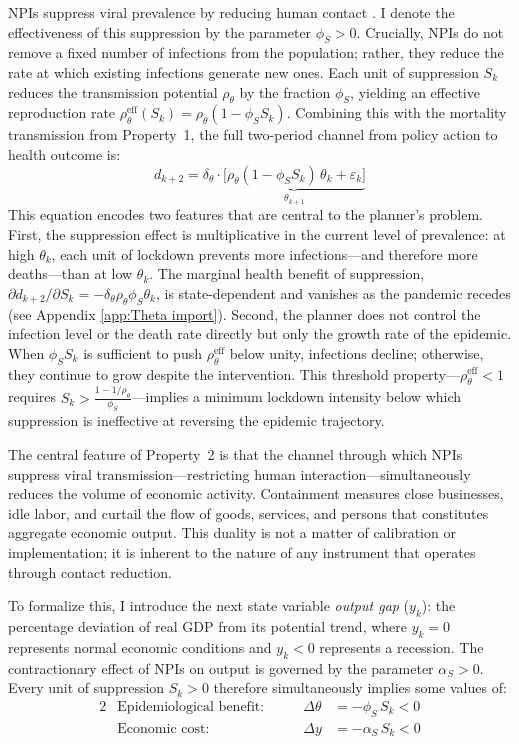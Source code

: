 \documentclass[12pt, a4paper]{article}
\newcommand{\Sk}{S_k}
\begin{document}
NPIs suppress viral prevalence by reducing human contact \citep{Flaxman2020}. I denote the effectiveness of this suppression by the parameter $\phi_S > 0$. Crucially, NPIs do not remove a fixed number of infections from the population; rather, they reduce the rate at which existing infections generate new ones. Each unit of suppression $S_k$ reduces the transmission potential $\rho_\theta$ by the fraction $\phi_S$, yielding an effective reproduction rate $\rho_\theta^{\text{eff}}(S_k) = \rho_\theta(1 - \phi_S S_k)$. Combining this with the mortality transmission from Property~1, the full two-period channel from policy action to health outcome is:
%
\begin{equation}
    d_{k+2} = \delta_\theta \cdot \underbrace{\bigl[\rho_\theta (1 - \phi_S S_k) \, \theta_k + \varepsilon_k\bigr]}_{\theta_{k+1}} 
    \label{eq:excess dynamics}
\end{equation}
%
This equation encodes two features that are central to the planner's problem. First, the suppression effect is multiplicative in the current level of prevalence: at high $\theta_k$, each unit of lockdown prevents more infections---and therefore more deaths---than at low $\theta_k$. The marginal health benefit of suppression, $\partial d_{k+2} / \partial S_k = -\delta_\theta \rho_\theta \phi_S \theta_k$, is state-dependent and vanishes as the pandemic recedes (see Appendix \ref{app:Theta import}). Second, the planner does not control the infection level or the death rate directly but only the growth rate of the epidemic. When $\phi_S S_k$ is sufficient to push $\rho_\theta^{\text{eff}}$ below unity, infections decline; otherwise, they continue to grow despite the intervention. This threshold property---$\rho_\theta^{\text{eff}} < 1$ requires $S_k > \frac{1 - 1/\rho_\theta}{\phi_S}$---implies a minimum lockdown intensity below which suppression is ineffective at reversing the epidemic trajectory.

The central feature of Property~2 is that the channel through which NPIs suppress viral transmission---restricting human interaction---simultaneously reduces the volume of economic activity. Containment measures close businesses, idle labor, and curtail the flow of goods, services, and persons that constitutes aggregate economic output. This duality is not a matter of calibration or implementation; it is inherent to the nature of any instrument that operates through contact reduction.

To formalize this, I introduce the next state variable \textit{output gap} ($y_k$): the percentage deviation of real GDP from its potential trend, where $y_k = 0$ represents normal economic conditions and $y_k < 0$ represents a recession. The contractionary effect of NPIs on output is governed by the parameter $\alpha_S > 0$. Every unit of suppression $\Sk > 0$ therefore simultaneously implies some values of:
%
\begin{alignat}{2}
&\text{Epidemiological benefit:} &\qquad \Delta\theta &= -\phi_S \, \Sk < 0 \label{eq:S_health}\\[4pt]
&\text{Economic cost:} &\qquad \Delta y &= -\alpha_S \, \Sk < 0 \label{eq:S_econ}
\end{alignat}
%
\end{document}
